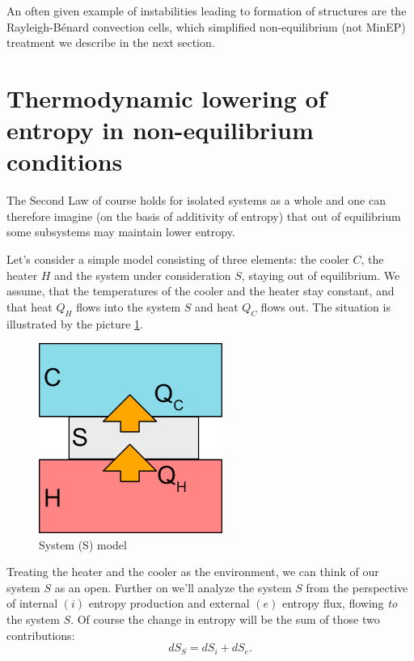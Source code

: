 \documentclass[a4paper,12pt]{article}
\begin{document}
An often given example of instabilities leading to formation of structures are the Rayleigh-Bénard convection cells, which simplified non-equilibrium (not MinEP) treatment we describe in the next section.

\section{Thermodynamic lowering of entropy in non-equilibrium conditions}
\label{simple-model}

The Second Law of course holds for isolated systems as a whole and one can therefore imagine (on the basis of additivity of entropy) that out of equilibrium some subsystems may maintain lower entropy.

Let's consider a simple model consisting of three elements: the cooler $C$, the heater $H$ and the system under consideration $S$, staying out of equilibrium.
We assume, that the temperatures of the cooler and the heater stay constant, and that heat $Q_H$ flows into the system $S$ and heat $Q_C$ flows out. The situation is illustrated by the picture \ref{Fig2}.
\begin{figure}[ht!]
\centering \includegraphics[width=6cm]{system} \caption{System (S) model}
\label{Fig2} 
\end{figure}

Treating the heater and the cooler as the environment, we can think of our system $S$ as an open.
Further on we'll analyze the system $S$ from the perspective of internal $(i)$ entropy production
and external $(e)$ entropy flux, flowing \emph{to} the system $S$. 
Of course the change in entropy will be the sum of those two contributions:
\begin{equation}
dS_S=dS_i+dS_e.
\label{entrosum}
\end{equation}
\end{document}
